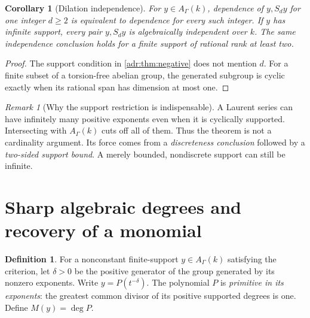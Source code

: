 \documentclass[11pt,letterpaper]{article}
\numberwithin{equation}{section}
\newtheorem{corollary}[corollary]{Corollary}
\theoremstyle{definition}
\newtheorem{definition}[definition]{Definition}
\theoremstyle{remark}
\newtheorem{remark}[remark]{Remark}
\newcommand{\A}{A_\Gamma(k)}
\begin{document}
\begin{corollary}[Dilation independence]\label{adr:cor:d-independent}
For $y\in\A$, dependence of $y,S_dy$ for one integer $d\ge2$ is
equivalent to dependence for every such integer. If $y$ has infinite
support, every pair $y,S_dy$ is algebraically independent over $k$.
The same independence conclusion holds for a finite support of rational
rank at least two.
\end{corollary}
\begin{proof}
The support condition in \cref{adr:thm:negative} does not mention $d$.
For a finite subset of a torsion-free abelian group, the generated subgroup
is cyclic exactly when its rational span has dimension at most one.
\end{proof}

\begin{remark}[Why the support restriction is indispensable]
A Laurent series can have infinitely many positive exponents even when
it is cyclically supported. Intersecting with $\A$ cuts off all of them.
Thus the theorem is not a cardinality argument. Its force comes from a
\emph{discreteness conclusion} followed by a \emph{two-sided support bound}.
A merely bounded, nondiscrete support can still be infinite.
\end{remark}

\section{Sharp algebraic degrees and recovery of a monomial}
\label{adr:sec:degree}

\begin{definition}
For a nonconstant finite-support $y\in\A$ satisfying the criterion, let
$\delta>0$ be the positive generator of the group generated by its
nonzero exponents. Write $y=P(t^{-\delta})$. The polynomial $P$ is
\emph{primitive in its exponents}: the greatest common divisor of its
positive supported degrees is one. Define $M(y)=\deg P$.
\end{definition}
\end{document}
